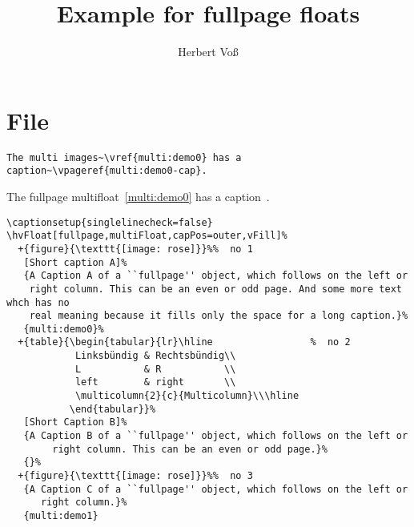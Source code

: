 \documentclass[twoside]{scrartcl}
\begin{document}
\title{Example for fullpage floats}
\author{Herbert Voß}
\maketitle

\tableofcontents


\twocolumn
\Blindtext

\section{File \texttt{\jobname}}

\begin{lstlisting}
The multi images~\vref{multi:demo0} has a caption~\vpageref{multi:demo0-cap}.
\end{lstlisting}

The fullpage multifloat~\vref{multi:demo0} has a caption~.


\begin{lstlisting}
\captionsetup{singlelinecheck=false}
\hvFloat[fullpage,multiFloat,capPos=outer,vFill]%
  +{figure}{\texttt{[image: rose]}}%%  no 1
   [Short caption A]%
   {A Caption A of a ``fullpage'' object, which follows on the left or
    right column. This can be an even or odd page. And some more text whch has no
    real meaning because it fills only the space for a long caption.}%
   {multi:demo0}%
  +{table}{\begin{tabular}{lr}\hline                 %  no 2
            Linksbündig & Rechtsbündig\\
            L           & R           \\
            left        & right       \\
            \multicolumn{2}{c}{Multicolumn}\\\hline
           \end{tabular}}%
   [Short Caption B]%
   {A Caption B of a ``fullpage'' object, which follows on the left or
        right column. This can be an even or odd page.}%
   {}%
  +{figure}{\texttt{[image: rose]}}%%  no 3
   {A Caption C of a ``fullpage'' object, which follows on the left or
      right column.}%
   {multi:demo1}
\end{lstlisting}

\Float[Multi]
\end{document}
